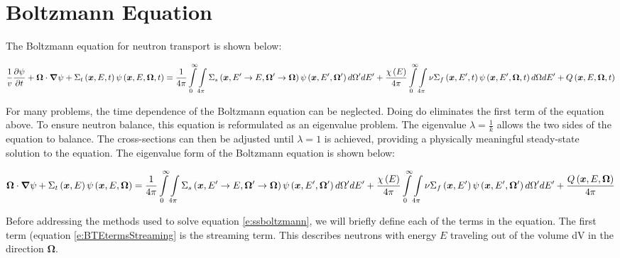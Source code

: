 \section{Boltzmann Equation}

The Boltzmann equation for neutron transport is shown below:

\begin{dmath}\label{e:boltzmann}
{\frac{1}{v} \frac{\partial \psi}{\partial t} + \bm \Omega \cdot \bm \nabla \psi + \Sigma_t\left(\bm x,E,t\right)\psi\left(\bm x,E,\bm \Omega,t\right)} = {\frac{1}{4\pi}\intop_0^{\infty} \intop_{4\pi} \Sigma_s\left(\bm x,E' \rightarrow E, \bm \Omega' \rightarrow \bm \Omega\right) \psi\left(\bm x,E',\bm \Omega'\right) d\Omega' dE'} + {\frac{\chi\left(E\right)}{4\pi} \intop_0^{\infty} \intop_{4\pi} \nu \Sigma_f\left(\bm x,E',t\right) \psi\left(\bm x,E',\bm \Omega,t\right) d\Omega dE' + Q\left(\bm x,E,\bm \Omega,t\right)}
\end{dmath}

For many problems, the time dependence of the Boltzmann equation can be neglected.  Doing do eliminates the first term of the equation above.  To ensure neutron balance, this equation is reformulated as an eigenvalue problem.  The eigenvalue $\lambda = \frac{1}{k}$ allows the two sides of the equation to balance.  The cross-sections can then be adjusted until $\lambda = 1$ is achieved, providing a physically meaningful steady-state solution to the equation.  The eigenvalue form of the Boltzmann equation is shown below:

\begin{dmath}\label{e:ssboltzmann}
{\bm \Omega \cdot \bm \nabla \psi + \Sigma_t\left(\bm x,E\right)\psi\left(\bm x,E,\bm \Omega\right) = \frac{1}{4\pi}\intop_0^{\infty} \intop_{4\pi} \Sigma_s\left(\bm x,E' \rightarrow E, \bm \Omega' \rightarrow \bm \Omega\right) \psi\left(\bm x,E',\bm \Omega'\right) d\Omega' dE'} + {\frac{\chi\left(E\right)}{4\pi} \intop_0^{\infty} \intop_{4\pi} \nu \Sigma_f\left(\bm x,E'\right) \psi\left(\bm x,E',\bm \Omega'\right) d\Omega' dE' + \frac{Q\left(\bm x,E,\bm \Omega\right)}{4\pi}}
\end{dmath}

Before addressing the methods used to solve equation \ref{e:ssboltzmann}, we will briefly define each of the terms in the equation.  The first term (equation \ref{e:BTEtermsStreaming} is the streaming term.  This describes neutrons with energy $E$ traveling out of the volume dV in the direction $\bm\Omega$.


